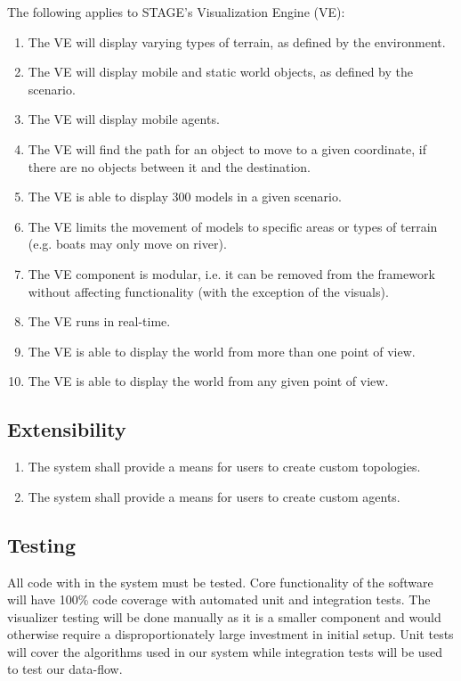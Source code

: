 \documentclass[titlepage]{article}
\begin{document}
The following applies to STAGE's Visualization Engine (VE):
\begin{enumerate}
    \item The VE will display varying types of terrain, as defined by the environment.
    \item The VE will display mobile and static world objects, as defined by the scenario.
    \item The VE will display mobile agents.
    \item The VE will find the path for an object to move to a given coordinate, if there are no objects between it and the destination.
    \item The VE is able to display 300 models in a given scenario.
    \item The VE limits the movement of models to specific areas or types of terrain (e.g. boats may only move on river).
    \item The VE component is modular, i.e. it can be removed from the framework without affecting functionality (with the exception of the visuals).
    \item The VE runs in real-time.
    \item The VE is able to display the world from more than one point of view.
    \item The VE is able to display the world from any given point of view.
\end{enumerate}

\subsection{Extensibility%
  \label{extensibility}%
}
\begin{enumerate}
    \item The system shall provide a means for users to create custom topologies.
    \item The system shall provide a means for users to create custom agents.
\end{enumerate}

\subsection{Testing%
    \label{testing}%
}
All code with in the system must be tested. Core functionality of the software will have 100\% code coverage with automated unit and integration tests.  The visualizer testing will be done manually as it is a smaller component and would otherwise require a disproportionately large investment in initial setup.  Unit tests will cover the algorithms used in our system while integration tests will be used to test our data-flow.  
\end{document}
